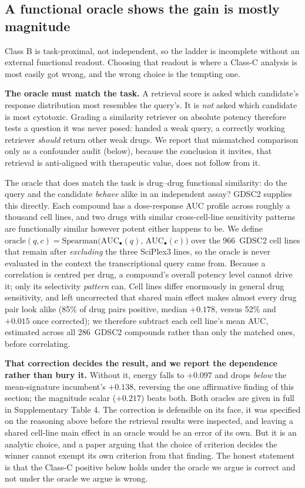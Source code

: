 \documentclass[11pt,letterpaper]{article}
\newcommand{\CTXLINES}{966}
\newcommand{\NGDSCDRUGS}{286}
\newcommand{\CENTERUNCEN}{85\% of drug pairs positive, median $+0.178$, versus 52\% and
  $+0.015$ once corrected}
\begin{document}
\subsection*{A functional oracle shows the gain is mostly magnitude}

Class B is task-proximal, not independent, so the ladder is incomplete without an external
functional readout. Choosing that readout is where a Class-C analysis is most easily got wrong,
and the wrong choice is the tempting one.

\textbf{The oracle must match the task.} A retrieval score is asked which candidate's response
distribution most resembles the query's. It is \emph{not} asked which candidate is most
cytotoxic. Grading a similarity retriever on absolute potency therefore tests a question it was
never posed: handed a weak query, a correctly working retriever \emph{should} return other weak
drugs. We report that mismatched comparison only as a confounder audit (below), because the
conclusion it invites, that retrieval is anti-aligned with therapeutic value, does not follow
from it.

The oracle that does match the task is drug--drug functional similarity: do the query
and the candidate \emph{behave} alike in an independent assay? GDSC2\cite{GDSC,GDSCLandscape} supplies this directly.
Each compound has a dose-response AUC profile across roughly a thousand cell lines, and two
drugs with similar cross-cell-line sensitivity patterns are functionally similar however potent
either happens to be. We define
$\mathrm{oracle}(q,c) = \mathrm{Spearman}\big(\mathrm{AUC}_{\bullet}(q),\,
\mathrm{AUC}_{\bullet}(c)\big)$ over the \CTXLINES\ GDSC2 cell lines that remain after
\emph{excluding} the three SciPlex3 lines, so the oracle is never evaluated in the context the
transcriptional query came from. Because a correlation is centred per drug, a compound's
overall potency level cannot drive it; only its selectivity \emph{pattern} can. Cell lines
differ enormously in general drug sensitivity, and left uncorrected that shared main effect makes
almost every drug pair look alike (\CENTERUNCEN); we therefore subtract each cell line's mean AUC,
estimated across all \NGDSCDRUGS\ GDSC2 compounds rather than only the matched ones, before
correlating.

\textbf{That correction decides the result, and we report the dependence rather than bury it.}
Without it, energy falls to $+0.097$ and drops \emph{below} the mean-signature incumbent's
$+0.138$, reversing the one affirmative finding of this section; the magnitude scalar
($+0.217$) beats both. Both oracles are given in full in Supplementary Table 4. The correction is
defensible on its face, it was specified on the reasoning above before the retrieval results were
inspected, and leaving a shared cell-line main effect in an oracle would be an error of its own.
But it is an analytic choice, and a paper arguing that the choice of criterion decides the winner
cannot exempt its own criterion from that finding. The honest statement is that the Class-C
positive below holds under the oracle we argue is correct and not under the oracle we argue is
wrong.
\end{document}
